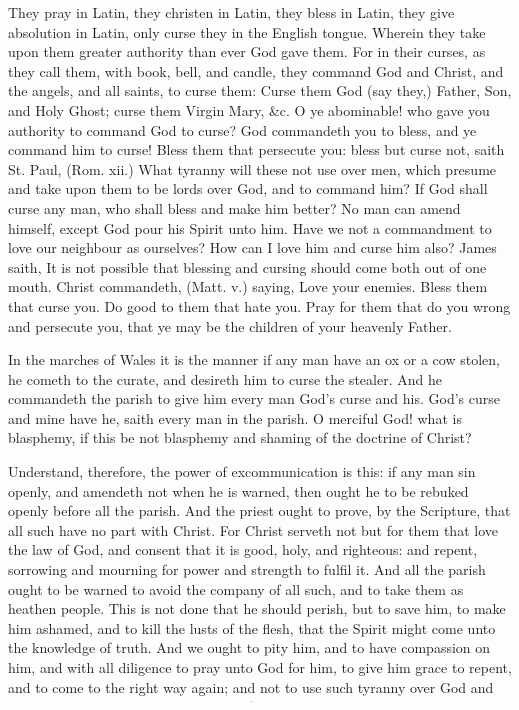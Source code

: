 They pray in Latin, they christen in Latin, they bless 
in Latin, they give absolution in Latin, only curse they 
in the English tongue. Wherein they take upon them 
greater authority than ever God gave them. For in their 
curses, as they call them, with book, bell, and candle, 
they command God and Christ, and the angels, and all 
saints, to curse them: Curse them God (say they,) Father, 
Son, and Holy Ghost; curse them Virgin Mary, \&c. O 
ye abominable! who gave you authority to command God 
to curse? God commandeth you to bless, and ye command
him to curse! Bless them that persecute you: 
bless but curse not, saith St. Paul, (Rom. xii.) What 
tyranny will these not use over men, which presume and 
take upon them to be lords over God, and to command 
him? If God shall curse any man, who shall bless and 
make him better? No man can amend himself, except 
God pour his Spirit unto him. Have we not a commandment
to love our neighbour as ourselves? How can 
I love him and curse him also? James saith, It is not 
possible that blessing and cursing should come both out of 
one mouth. Christ commandeth, (Matt. v.) saying, Love 
your enemies. Bless them that curse you. Do good to 
them that hate you. Pray for them that do you wrong 
and persecute you, that ye may be the children of your 
heavenly Father. 

In the marches of Wales it is the manner if any man 
have an ox or a cow stolen, he cometh to the curate, 
and desireth him to curse the stealer. And he commandeth
the parish to give him every man God's curse and 
his. God's curse and mine have he, saith every man in 
the parish. O merciful God! what is blasphemy, if 
this be not blasphemy and shaming of the doctrine of 
Christ? 

Understand, therefore, the power of excommunication 
is this: if any man sin openly, and amendeth not when 
he is warned, then ought he to be rebuked openly before 
all the parish. And the priest ought to prove, by the 
Scripture, that all such have no part with Christ. For 
Christ serveth not but for them that love the law of God, 
and consent that it is good, holy, and righteous: and 
repent, sorrowing and mourning for power and strength 
to fulfil it. And all the parish ought to be warned to 
avoid the company of all such, and to take them as 
heathen people. This is not done that he should perish, 
but to save him, to make him ashamed, and to kill the 
lusts of the flesh, that the Spirit might come unto the 
knowledge of truth. And we ought to pity him, and to 
have compassion on him, and with all diligence to pray 
unto God for him, to give him grace to repent, and to 
come to the right way again; and not to use such tyranny 
over God and man, commanding God to curse. And if 
he repent, we ought with all mercy to receive him in 
again. This mayest thou see Matt. xviii. and 1 Cor. v. 
and 2 Cor. ii. 


